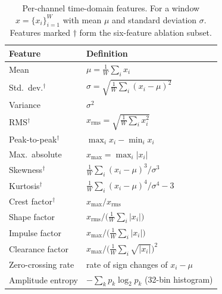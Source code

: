 \begin{table}[t]
\centering
\caption{Per-channel time-domain features. For a window
$x=\{x_i\}_{i=1}^{W}$ with mean $\mu$ and standard deviation $\sigma$.
Features marked $\dagger$ form the six-feature ablation subset.}
\label{tab:features}
\renewcommand{\arraystretch}{1.45}
\begin{tabular}{@{}ll@{}}
\toprule
\textbf{Feature} & \textbf{Definition} \\
\midrule
Mean & $\mu=\frac{1}{W}\sum_i x_i$ \\
Std.\ dev.$^\dagger$ & $\sigma=\sqrt{\frac{1}{W}\sum_i (x_i-\mu)^2}$ \\
Variance & $\sigma^2$ \\
RMS$^\dagger$ & $x_{\mathrm{rms}}=\sqrt{\frac{1}{W}\sum_i x_i^2}$ \\
Peak-to-peak$^\dagger$ & $\max_i x_i-\min_i x_i$ \\
Max.\ absolute & $x_{\max}=\max_i |x_i|$ \\
Skewness$^\dagger$ & $\frac{1}{W}\sum_i (x_i-\mu)^3/\sigma^3$ \\
Kurtosis$^\dagger$ & $\frac{1}{W}\sum_i (x_i-\mu)^4/\sigma^4-3$ \\
Crest factor$^\dagger$ & $x_{\max}/x_{\mathrm{rms}}$ \\
Shape factor & $x_{\mathrm{rms}}/\big(\frac{1}{W}\sum_i |x_i|\big)$ \\
Impulse factor & $x_{\max}/\big(\frac{1}{W}\sum_i |x_i|\big)$ \\
Clearance factor & $x_{\max}/\big(\frac{1}{W}\sum_i \sqrt{|x_i|}\big)^2$ \\
Zero-crossing rate & rate of sign changes of $x_i-\mu$ \\
Amplitude entropy & $-\sum_k p_k\log_2 p_k$ (32-bin histogram) \\
\bottomrule
\end{tabular}
\end{table}
